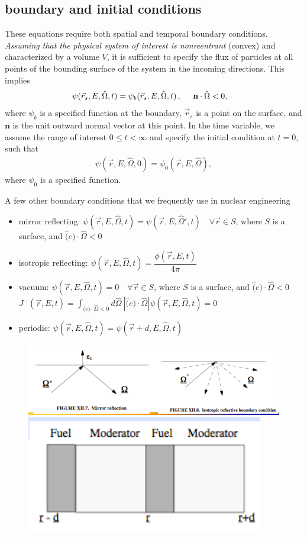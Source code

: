 \documentclass[12pt]{article}
\newcommand{\rvec}{\ensuremath{\vec{r}}}
\newcommand{\omvec}{\ensuremath{\hat{\Omega}}}
\newcommand{\vOmega}{\ensuremath{\hat{\Omega}}}
\begin{document}
\subsection*{boundary and initial conditions}
These equations require both spatial and temporal boundary conditions.
\textit{Assuming that the
physical
system of interest is nonreentrant} (convex) and characterized by a
volume $V$, it is sufficient to specify the flux of
particles at all points of the bounding surface of the system in the incoming
directions. This implies
\begin{align*}
\psi(\rvec_s, E,\omvec,t) &= \psi_b(\rvec_s,E,\omvec,t)\,, \hspace{0.5 cm} \textbf{n} \cdot \omvec <0,
\end{align*}
 where $\psi_b$ is a specified function at the boundary, $\rvec_s$ is a point on the surface, and $\textbf{n}$ is the unit
outward normal vector at this point. In the time variable, we assume the range of
interest $0\leq t<\infty$ and specify the
initial condition at $t=0$, such that
\begin{align*}
\psi(\rvec,E,\omvec,0) = \psi_0(\rvec,E,\omvec),
\end{align*}
 where $\psi_0$ is a specified function.

A few other boundary conditions that we frequently use in nuclear engineering
\begin{itemize}
\item mirror reflecting: $\psi(\vec{r}, E, \vOmega, t) =  \psi(\vec{r}, E, \vOmega', t) \quad \forall \vec{r} \in S$, where $S$ is a surface, and $\hat(e)\cdot \vOmega < 0$
\item isotropic reflecting: $\psi(\vec{r}, E, \vOmega, t) =  \dfrac{\phi(\vec{r}, E, t)}{4\pi}$
\item vacuum: $\psi(\vec{r}, E, \vOmega, t) = 0\quad \forall \vec{r} \in S$, where $S$ is a surface, and $\hat(e)\cdot \vOmega < 0$ \\
$J^-(\vec{r}, E, t) = \int_{\hat(e)\cdot \vOmega < 0} d\vOmega \: |\hat(e)\cdot \vOmega| \psi(\vec{r}, E, \vOmega, t) = 0$
\item periodic: $\psi(\vec{r}, E, \vOmega, t) = \psi(\vec{r} + d, E, \vOmega, t)$
\end{itemize}

\begin{figure}[h!]
    \begin{center}
    \includegraphics[keepaspectratio, width = 3.5 in]{reflecting-bc}
     \includegraphics[keepaspectratio, width = 2 in]{periodic-bc}
    \end{center}
\end{figure}
\end{document}
